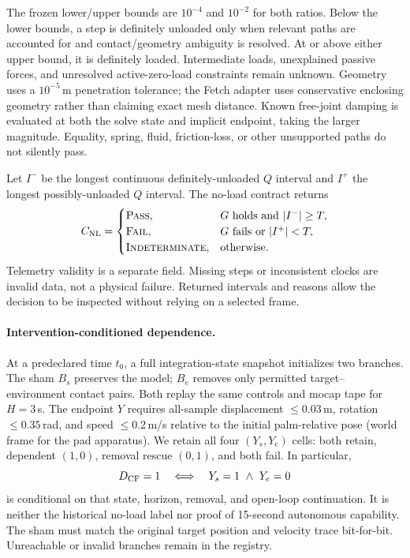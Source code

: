 The frozen lower/upper bounds are $10^{-4}$ and $10^{-2}$ for both ratios.
Below the lower bounds, a step is definitely unloaded only when relevant paths
are accounted for and contact/geometry ambiguity is resolved. At or above
either upper bound, it is definitely loaded. Intermediate loads, unexplained
passive forces, and unresolved active-zero-load constraints remain unknown.
Geometry uses a $10^{-5}$\,m penetration tolerance; the Fetch adapter uses
conservative enclosing geometry rather than claiming exact mesh distance.
Known free-joint damping is evaluated at both the solve state and implicit
endpoint, taking the larger magnitude. Equality, spring, fluid, friction-loss,
or other unsupported paths do not silently pass.

Let $I^-$ be the longest continuous definitely-unloaded $Q$ interval and $I^+$
the longest possibly-unloaded $Q$ interval. The no-load contract returns
\begin{equation}
 C_{\mathrm{NL}}=\begin{cases}
 \textsc{Pass},&G\text{ holds and }|I^-|\ge T,\\
 \textsc{Fail},&G\text{ fails or }|I^+|<T,\\
 \textsc{Indeterminate},&\text{otherwise.}
 \end{cases}
\end{equation}
Telemetry validity is a separate field. Missing steps or inconsistent clocks
are invalid data, not a physical failure. Returned intervals and reasons allow
the decision to be inspected without relying on a selected frame.

\paragraph{Intervention-conditioned dependence.}
At a predeclared time $t_0$, a full integration-state snapshot initializes two
branches. The sham $B_s$ preserves the model; $B_e$ removes only permitted
target--environment contact pairs. Both replay the same controls and mocap tape
for $H=3$\,s. The endpoint $Y$ requires all-sample displacement $\le0.03$\,m,
rotation $\le0.35$\,rad, and speed $\le0.2$\,m/s relative to the initial
palm-relative pose (world frame for the pad apparatus). We retain all four
$(Y_s,Y_e)$ cells: both retain, dependent $(1,0)$, removal rescue $(0,1)$, and
both fail. In particular,
\begin{equation}
 \CF=1\quad\Longleftrightarrow\quad Y_s=1\ \wedge\ Y_e=0
\end{equation}
is conditional on that state, horizon, removal, and open-loop continuation.
It is neither the historical no-load label nor proof of 15-second autonomous
capability. The sham must match the original target position and velocity
trace bit-for-bit. Unreachable or invalid branches remain in the registry.

